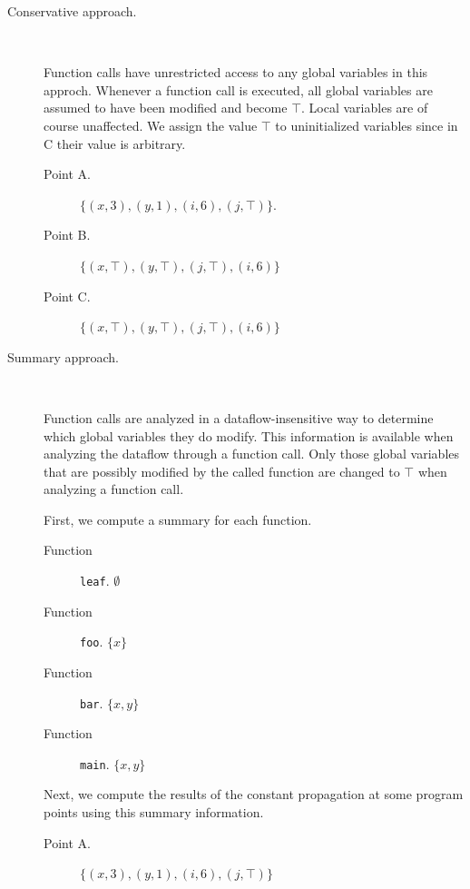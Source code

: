 \documentclass[letterpaper,11pt]{article}
\newcommand{\codesnip}{\texttt}
\begin{document}
\begin{description}
  \item[Conservative approach.] ~

    Function calls have unrestricted access to any global variables in this
    approch. Whenever a function call is executed, all global variables are
    assumed to have been modified and become $\top$. Local variables are of
    course unaffected. We assign the value $\top$ to uninitialized variables
    since in C their value is arbitrary.

    \begin{description}
      \item[Point A.]
        $\{ (x, 3), (y, 1), (i, 6), (j, \top)\}$.

      \item[Point B.]
        $\{ (x, \top), (y, \top), (j, \top), (i, 6) \}$

      \item[Point C.]
        $\{ (x, \top), (y, \top), (j, \top), (i, 6) \}$
    \end{description}

  \item[Summary approach.] ~

    Function calls are analyzed in a dataflow-insensitive way to determine
    which global variables they do modify. This information is available when
    analyzing the dataflow through a function call. Only those global variables
    that are possibly modified by the called function are changed to $\top$
    when analyzing a function call.

    First, we compute a summary for each function.

    \begin{description}
      \item[Function] \codesnip{leaf}.  $\emptyset$
      \item[Function] \codesnip{foo}. $\{ x \}$
      \item[Function] \codesnip{bar}. $\{ x, y \}$
      \item[Function] \codesnip{main}. $\{ x, y \}$
    \end{description}

    Next, we compute the results of the constant propagation at some program
    points using this summary information.

    \begin{description}
      \item[Point A.]
        $\{ (x, 3), (y, 1), (i, 6), (j, \top) \}$


\end{description}
\end{description}
\end{document}

